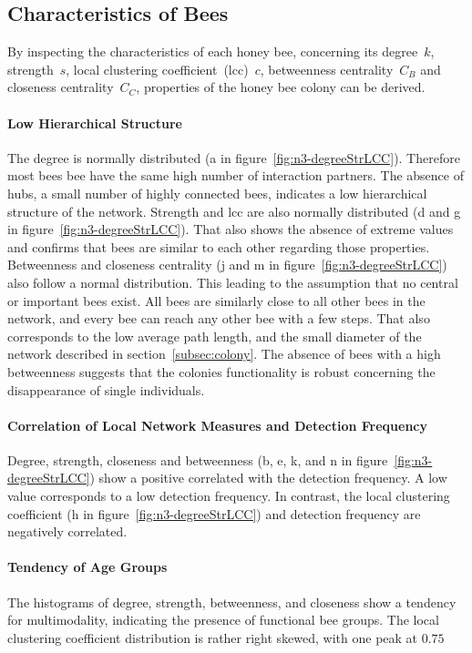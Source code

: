 \subsection{Characteristics of Bees}
By inspecting the characteristics of each honey bee, concerning its degree~$k$, strength~$s$, local clustering coefficient~(lcc)~$c$, betweenness centrality~$C_B$ and closeness centrality~$C_C$, properties of the honey bee colony can be derived.

\paragraph*{Low Hierarchical Structure}
The degree is normally distributed (a in figure~\ref{fig:n3-degreeStrLCC}).
Therefore most bees bee have the same high number of interaction partners.
The absence of hubs, a small number of highly connected bees, indicates a low hierarchical structure of the network.
Strength and lcc are also normally distributed (d and g in figure~\ref{fig:n3-degreeStrLCC}).
That also shows the absence of extreme values and confirms that bees are similar to each other regarding those properties.
Betweenness and closeness centrality (j and m in figure~\ref{fig:n3-degreeStrLCC}) also follow a normal distribution.
This leading to the assumption that no central or important bees exist.
All bees are similarly close to all other bees in the network, and every bee can reach any other bee with a few steps.
That also corresponds to the low average path length, and the small diameter of the network described in section~\ref{subsec:colony}.
The absence of bees with a high betweenness suggests that the colonies functionality is robust concerning the disappearance of single individuals.

\paragraph*{Correlation of Local Network Measures and Detection Frequency}
Degree, strength, closeness and betweenness (b, e, k, and n in figure~\ref{fig:n3-degreeStrLCC}) show a positive correlated with the detection frequency. A low value corresponds to a low detection frequency. In contrast, the local clustering coefficient (h in figure~\ref{fig:n3-degreeStrLCC}) and detection frequency are negatively correlated.

\paragraph*{Tendency of Age Groups}
The histograms of degree, strength, betweenness, and closeness show a tendency for multimodality, indicating the presence of functional bee groups. The local clustering coefficient distribution is rather right skewed, with one peak at $0.75$

